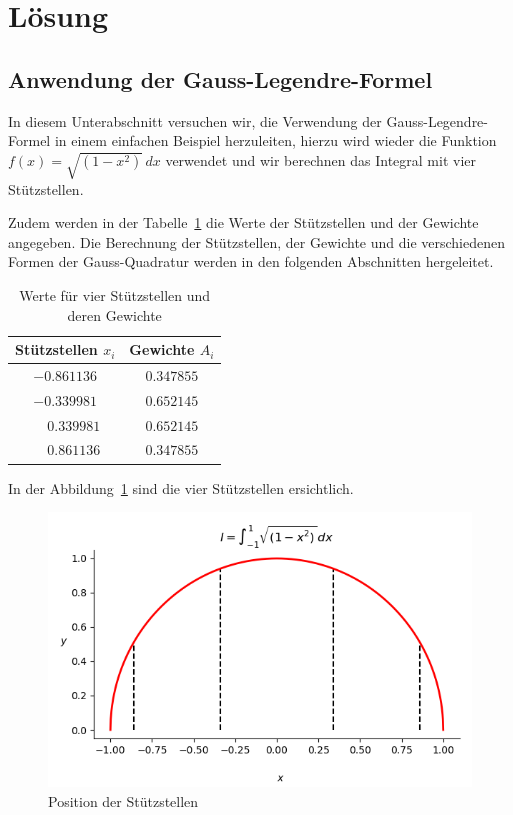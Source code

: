 %
%
%
\section{Lösung
\label{quadratur:section:loesung}}
\subsection{Anwendung der Gauss-Legendre-Formel
\label{quadratur:subsection:gausslegendreanwendung}}
In diesem Unterabschnitt versuchen wir, die Verwendung der Gauss-Legendre-Formel in einem
einfachen Beispiel herzuleiten, hierzu wird wieder die Funktion  
$f(x) = \sqrt{(1-x^2)}\,dx$ verwendet und 
wir berechnen das Integral mit vier Stützstellen.

Zudem werden in der Tabelle~\ref{buch:table:gaussbeispielwerte} die Werte der 
Stützstellen und der Gewichte angegeben. Die Berechnung der Stützstellen, der Gewichte
und die verschiedenen Formen der Gauss-Quadratur werden in den folgenden Abschnitten 
hergeleitet.

\begin{table}
    \centering
    \begin{tabular}{|c|c|}
        \hline
        Stützstellen $x_{i}$ & Gewichte $A_{i}$ \\
        \hline
        $-0.861136 $ & $ 0.347855 $ \\
        $-0.339981 $ & $ 0.652145 $ \\
        $\phantom{-} 0.339981 $ & $ 0.652145 $ \\
        $\phantom{-} 0.861136 $ & $ 0.347855 $ \\
        \hline
    \end{tabular}
    \caption{Werte für vier Stützstellen und deren Gewichte
    \label{buch:table:gaussbeispielwerte}}    
\end{table}


In der Abbildung~\ref{quadratur:figure:gausslegendre1} sind die vier Stützstellen 
ersichtlich.

\begin{figure}
    \centering
    \includegraphics[scale=0.7]{papers/quadratur/figures/GaussLegendre1.png}
    \caption{ Position der Stützstellen
    \label{quadratur:figure:gausslegendre1}}
\end{figure}

